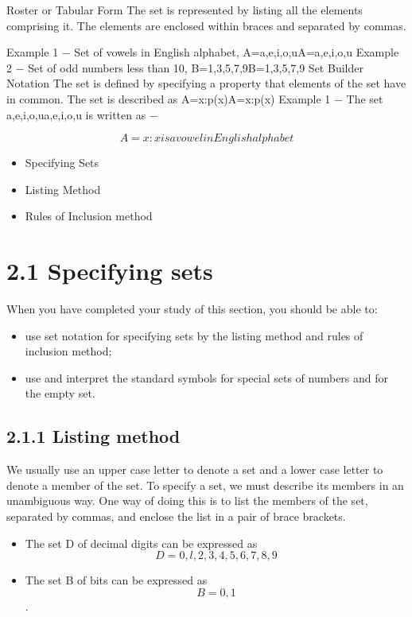 \documentclass[11pt,a4paper,titlepage,oneside,openany]{article}
\numberwithin{equation}{section}
\numberwithin{algorithm}{section}
\numberwithin{figure}{section}
\numberwithin{table}{section}
\begin{document}
Roster or Tabular Form
The set is represented by listing all the elements comprising it. The elements are enclosed within braces and separated by commas.

Example 1 − Set of vowels in English alphabet, A={a,e,i,o,u}A={a,e,i,o,u}
Example 2 − Set of odd numbers less than 10, B={1,3,5,7,9}B={1,3,5,7,9}
Set Builder Notation
The set is defined by specifying a property that elements of the set have in common. The set is described as A={x:p(x)}A={x:p(x)}
Example 1 − The set {a,e,i,o,u}{a,e,i,o,u} is written as −

\[A={x:x is a vowel in English alphabet}\]


\begin{itemize}
\item Specifying Sets
\item Listing Method
\item Rules of Inclusion method
\end{itemize}
\section{2.1 Specifying sets}
\smallskip 
When you have completed your study of this section, you should be able to:
\begin{itemize}
\item use set notation for specifying sets by the listing method and rules of inclusion method;
\item use and interpret the standard symbols for special sets of numbers and for the empty set.
\end{itemize}

\smallskip 
\subsection{2.1.1 Listing method}
\smallskip 
We usually use an upper case letter to denote a set and a lower case letter to denote a member of
the set. To specify a set, we must describe its members in an unambiguous way. One way of doing
this is to list the members of the set, separated by commas, and enclose the list in a pair of brace
brackets.
\smallskip 
\smallskip 
\begin{itemize}
\item The set D of decimal digits can be expressed as
\[D = {0, l,2,3,4,5,6,7,8,9}\]
\item The set B of bits can be expressed as
\[B= {0,1}\]. 
\end{itemize}
\smallskip 
\end{document}
